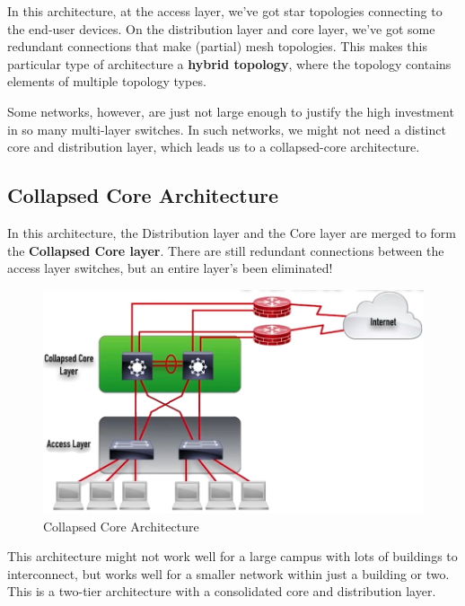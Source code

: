 In this architecture, at the access layer, we've got star topologies connecting to the end-user devices. On the distribution layer and core layer, we've got some redundant connections that make (partial) mesh topologies. This makes this particular type of architecture a \textbf{hybrid topology}, where the topology contains elements of multiple topology types. 

Some networks, however, are just not large enough to justify the high investment in so many multi-layer switches. In such networks, we might not need a distinct core and distribution layer, which leads us to a collapsed-core architecture. 
\vspace{-5pt}

\subsection{Collapsed Core Architecture}
In this architecture, the Distribution layer and the Core layer are merged to form the \textbf{Collapsed Core layer}. There are still redundant connections between the access layer switches, but an entire layer's been eliminated!
\vspace{-7pt}
\begin{figure}[H]
	\centering
	\includegraphics[width=0.7\linewidth]{"Mod1/chapters/1.3.e CollapsedCoreArch"}
	\caption{Collapsed Core Architecture}
	\label{fig:collapsed_core_arch}
\end{figure}
\vspace{-12pt}
\noindent
This architecture might not work well for a large campus with lots of buildings to interconnect, but works well for a smaller network within just a building or two. This is a two-tier architecture  with a consolidated core and distribution layer. 
